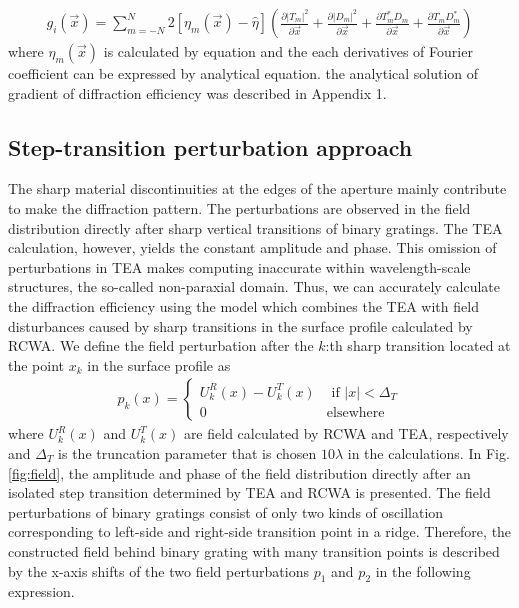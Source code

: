 \begin{align}
g_i(\vec{x}) = \sum_{m=-N}^{N}2\left[\eta_{m}(\vec{x})-\hat{\eta}\right]\left(\frac{\partial \left | T_{m} \right | ^2  }{\partial \vec{x}} + \frac{\partial \left | D_{m} \right | ^2  }{\partial \vec{x}} + \frac{\partial T_{m}^{*} D_{m}  }{\partial \vec{x}} + \frac{\partial T_{m} D_{m}^{*}  }{\partial \vec{x}}\right)
\end{align}
where $\eta_m(\vec{x})$ is calculated by equation and the each derivatives of Fourier coefficient can be expressed by analytical equation. the analytical solution of gradient of diffraction efficiency was described in Appendix 1.

\subsection{Step-transition perturbation approach}
The sharp material discontinuities at the edges of the aperture mainly contribute to make the diffraction pattern. 
The perturbations are observed in the field distribution directly after sharp vertical transitions of binary gratings. 
The TEA calculation, however, yields the constant amplitude and phase.
This omission of perturbations in TEA makes computing inaccurate within wavelength-scale structures, the so-called non-paraxial domain.
Thus, we can accurately calculate the diffraction efficiency using the model which combines the TEA with field disturbances caused by sharp transitions in the surface profile calculated by RCWA.
We define the field perturbation after the $k$:th sharp transition located at the point $x_{k}$ in the surface profile as
\begin{align}\label{eq:perturbation}
p_{k}(x) =
    \begin{cases}
        U_{k}^{R}(x) - U_{k}^{T}(x) & \text{ if } \left | x  \right | < \Delta_{T} \\
        0 & \text{elsewhere} 
    \end{cases}
\end{align}
where $U_{k}^{R}(x)$ and $U_{k}^{T}(x)$ are field calculated by RCWA and TEA, respectively and $\Delta_{T}$ is the truncation parameter that is chosen $10\lambda$ in the calculations\cite{Vallius2001}.
In Fig. \ref{fig:field}, the amplitude and phase of the field distribution directly after an isolated step transition determined by TEA and RCWA is presented.
The field perturbations of binary gratings consist of only two kinds of oscillation corresponding to left-side and right-side transition point in a ridge.
Therefore, the constructed field behind binary grating with many transition points is described by the x-axis shifts of the two field perturbations $p_{1}$ and $p_{2}$ in the following expression.
